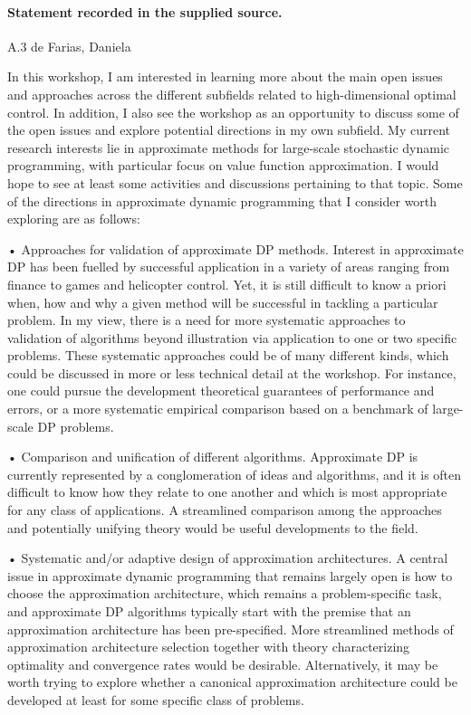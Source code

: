 \documentclass[11pt]{article}
\begin{document}
\paragraph{Statement recorded in the supplied source.}
A.3 de Farias, Daniela

In this workshop, I am interested in learning more about the main open issues and approaches across the different subfields related to high-dimensional optimal control. In addition, I also see the workshop as an opportunity to discuss some of the open issues and explore potential directions in my own subfield. My current research interests lie in approximate methods for large-scale stochastic dynamic programming, with particular focus on value function approximation. I would hope to see at least some activities and discussions pertaining to that topic. Some of the directions in approximate dynamic programming that I consider worth exploring are as follows:

• Approaches for validation of approximate DP methods. Interest in approximate DP has been fuelled by successful application in a variety of areas ranging from finance to games and helicopter control. Yet, it is still difficult to know a priori when, how and why a given method will be successful in tackling a particular problem. In my view, there is a need for more systematic approaches to validation of algorithms beyond illustration via application to one or two specific problems. These systematic approaches could be of many different kinds, which could be discussed in more or less technical detail at the workshop. For instance, one could pursue the development theoretical guarantees of performance and errors, or a more systematic empirical comparison based on a benchmark of large-scale DP problems.

• Comparison and unification of different algorithms. Approximate DP is currently represented by a conglomeration of ideas and algorithms, and it is often difficult to know how they relate to one another and which is most appropriate for any class of applications. A streamlined comparison among the approaches and potentially unifying theory would be useful developments to the field.

• Systematic and/or adaptive design of approximation architectures. A central issue in approximate dynamic programming that remains largely open is how to choose the approximation architecture, which remains a problem-specific task, and approximate DP algorithms typically start with the premise that an approximation architecture has been pre-specified. More streamlined methods of approximation architecture selection together with theory characterizing optimality and convergence rates would be desirable. Alternatively, it may be worth trying to explore whether a canonical approximation architecture could be developed at least for some specific class of problems.
\end{document}

